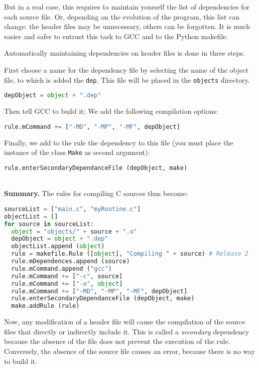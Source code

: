 \documentclass[a4paper,11pt]{extarticle}
\begin{document}
But in a real case, this requires to maintain yourself the list of dependencies for each source file. Or, depending on the evolution of the program, this list can change: the header files may be unnecessary, others can be forgotten. It is much easier and safer to entrust this task to GCC and to the Python makefile.

Automatically maintaining dependencies on header files is done in three steps.

First choose a name for the dependency file by selecting the name of the object file, to which is added the \texttt{dep}. This file will be placed in the \texttt{objects} directory.
\begin{lstlisting}[language=py]
  depObject = object + ".dep"
\end{lstlisting}

Then tell GCC to build it; We add the following compilation options:
\begin{lstlisting}[language=py]
  rule.mCommand += ["-MD", "-MP", "-MF", depObject]
\end{lstlisting}

Finally, we add to the rule the dependency to this file (you must place the instance of the class \texttt{Make} as second argument):
\begin{lstlisting}[language=py]
  rule.enterSecondaryDependanceFile (depObject, make)
\end{lstlisting}


~\\{\bf Summary.} The rules for compiling C sources thus become:
\begin{lstlisting}[language=py]
sourceList = ["main.c", "myRoutine.c"]
objectList = []
for source in sourceList:
  object = "objects/" + source + ".o"
  depObject = object + ".dep"
  objectList.append (object)
  rule = makefile.Rule ([object], "Compiling " + source) # Release 2
  rule.mDependences.append (source)
  rule.mCommand.append ("gcc")
  rule.mCommand += ["-c", source]
  rule.mCommand += ["-o", object]
  rule.mCommand += ["-MD", "-MP", "-MF", depObject]
  rule.enterSecondaryDependanceFile (depObject, make)
  make.addRule (rule)
\end{lstlisting}

Now, any modification of a header file will cause the compilation of the source files that directly or indirectly include it. This is called a \emph{secondary} dependency because the absence of the file does not prevent the execution of the rule. Conversely, the absence of the source file causes an error, because there is no way to build it.
\end{document}
